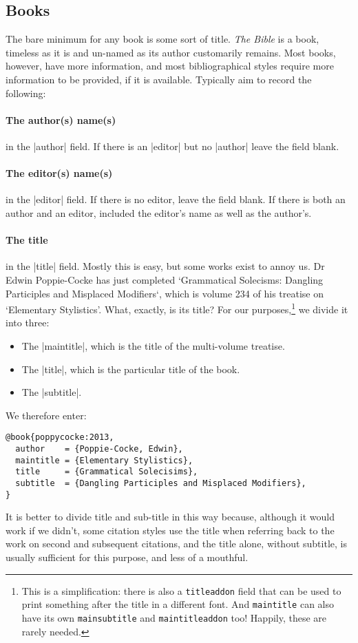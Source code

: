 {\subsection{Books}

The bare minimum for any book is some sort of title. \emph{The Bible} is a book, timeless as it is and un-named as its author customarily remains. Most books, however, have more information, and most bibliographical styles require more information to be provided, if it is available. Typically aim to record the following:

\paragraph{The author(s) name(s)} in the |author| field. If there is an |editor| but no |author| leave the field blank.

\paragraph{The editor(s) name(s)} in the |editor| field. If there is no editor, leave the field blank. If there is both an author and an editor, included the editor's name as well as the author's.

\paragraph{The title} in the |title| field. Mostly this is easy, but some works exist to annoy us. Dr Edwin Poppie-Cocke has just completed `Grammatical Solecisms: Dangling Participles and Misplaced Modifiers`, which is volume 234 of his treatise on `Elementary Stylistics'. What, exactly, is its title? For our purposes,\footnote{This is a simplification: there is also a \texttt{titleaddon} field that can be used to print something after the title in a different font. And \texttt{maintitle} can also have its own \texttt{mainsubtitle} and \texttt{maintitleaddon} too! Happily, these are rarely needed.} we divide it into three:
\begin{itemize}
\item The |maintitle|, which is the title of the multi-volume treatise.
\item The |title|, which is the particular title of the book.
\item The |subtitle|.
\end{itemize}
We therefore enter:
\begin{verbatim}
@book{poppycocke:2013,
  author    = {Poppie-Cocke, Edwin},
  maintitle = {Elementary Stylistics},
  title     = {Grammatical Solecisims},
  subtitle  = {Dangling Participles and Misplaced Modifiers},
}
\end{verbatim}
It is better to divide title and sub-title in this way because, although it would work if we didn't, some citation styles use the title when referring back to the work on second and subsequent citations, and the title alone, without subtitle, is usually sufficient for this purpose, and less of a mouthful.

}
